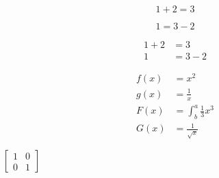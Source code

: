 \documentclass{article}
\begin{document}
\begin{equation*}
	1 + 2 = 3
\end{equation*}

\begin{equation*}
	1 = 3 - 2
\end{equation*}

\begin{align*}
	1 + 2 &= 3\\
	1 &= 3 - 2
\end{align*}

\begin{align*}
	f(x) &= x^2\\
	g(x) &= \frac{1}{x}\\
	F(x) &= \int^a_b \frac{1}{3}x^3\\
	G(x) &= \frac{1}{\sqrt{x}}
\end{align*}

\begin{center}
$\left[
\begin{matrix}
	1&0\\
	0&1
\end{matrix}
\right]$
\end{center}
\end{document}
